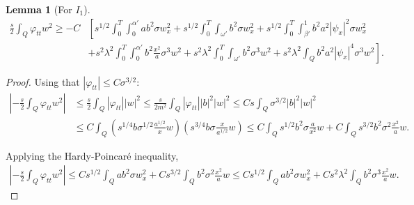 \documentclass[11pt,oneside,a4papper]{osajnl}
\newtheorem{lema}{Lemma}
\begin{document}
\begin{lema}[For $I_1$]\label{lemaA2_2}
\begin{align*}
    \frac{s}{2}\int_{Q}\varphi_{tt} w^2 \geq -C &\left[  s^{1/2}\int_0^T \int_0^{\alpha'} ab^2\sigma  w_x^2 + s^{1/2}\int_0^T\int_{\omega'} b^2 \sigma w_x^2 + s^{1/2}\int_{0}^{T} \int_{\beta'}^{1} b^2 a^2 |\psi_x|^2 \sigma w_x^2\right.\\
	&\left.+s^2\lambda^2\int_0^T \int_0^{\alpha'} b^2 \frac{x^2}{a} \sigma^3 w^2 + s^2\lambda^2\int_0^T\int_{\omega'} b^2 \sigma^3 w^2 +s^2\lambda^2 \int_Q b^2 a^2 |\psi_x|^4 \sigma^3 w^2\right].
\end{align*}
\end{lema}

\begin{proof}
Using that $|\varphi_{tt}|\leq C\sigma^{3/2}$:
\begin{align*}
    \left|-\frac{s}{2}\int_{Q}\varphi_{tt} w^2 \right| &\leq \frac{s}{2}\int_{Q}|\varphi_{tt}| |w|^2\leq \frac{s}{2m^2}\int_{Q}|\varphi_{tt}||b|^2 |w|^2 \leq Cs\int_{Q}\sigma^{3/2}|b|^2 |w|^2 \\
    &\leq C\int_{Q} \left(s^{1/4}b\sigma^{1/2}\frac{a^{1/2}}{x} w  \right)\left( s^{3/4}b\sigma^{}\frac{x}{a^{1/2}} w \right)
\leq C\int_{Q}s^{1/2}b^2\sigma\frac{a}{x^2} w+C\int_{Q}s^{3/2}b^2\sigma^2\frac{x^2}{a} w.
\end{align*}

Applying the Hardy-Poincaré inequality, 
	\begin{eqnarray*}
	\left|-\frac{s}{2}\int_{Q}\varphi_{tt} w^2 \right| \leq Cs^{1/2}\int_{Q}ab^2\sigma  w_x^2+Cs^{3/2}\int_{Q}b^2\sigma^2\frac{x^2}{a} w
        \leq Cs^{1/2}\int_{Q}ab^2\sigma  w_x^2+Cs^2\lambda^2\int_{Q}b^2\sigma^3\frac{x^2}{a} w.
\end{eqnarray*}	


\end{proof}
\end{document}
